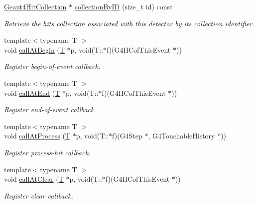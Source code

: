 \begin{DoxyCompactItemize}
\hyperlink{class_d_d4hep_1_1_simulation_1_1_geant4_hit_collection}{Geant4\+Hit\+Collection} $\ast$ \hyperlink{class_d_d4hep_1_1_simulation_1_1_geant4_sens_det_action_sequence_a51a324ce960e144da1f1a16a8c18f6f1}{collection\+By\+ID} (size\+\_\+t id) const
\begin{DoxyCompactList}\small\item\em Retrieve the hits collection associated with this detector by its collection identifier. \end{DoxyCompactList}\item 
{\footnotesize template$<$typename T $>$ }\\void \hyperlink{class_d_d4hep_1_1_simulation_1_1_geant4_sens_det_action_sequence_a45cf860e819a71b04572873736f809bb}{call\+At\+Begin} (\hyperlink{class_t}{T} $\ast$p, void(T\+::$\ast$f)(G4\+H\+Cof\+This\+Event $\ast$))
\begin{DoxyCompactList}\small\item\em Register begin-\/of-\/event callback. \end{DoxyCompactList}\item 
{\footnotesize template$<$typename T $>$ }\\void \hyperlink{class_d_d4hep_1_1_simulation_1_1_geant4_sens_det_action_sequence_aaba81a735f1ea292242434042174965b}{call\+At\+End} (\hyperlink{class_t}{T} $\ast$p, void(T\+::$\ast$f)(G4\+H\+Cof\+This\+Event $\ast$))
\begin{DoxyCompactList}\small\item\em Register end-\/of-\/event callback. \end{DoxyCompactList}\item 
{\footnotesize template$<$typename T $>$ }\\void \hyperlink{class_d_d4hep_1_1_simulation_1_1_geant4_sens_det_action_sequence_aa9a28a577e7167e18f9312febfe67657}{call\+At\+Process} (\hyperlink{class_t}{T} $\ast$p, void(T\+::$\ast$f)(G4\+Step $\ast$, G4\+Touchable\+History $\ast$))
\begin{DoxyCompactList}\small\item\em Register process-\/hit callback. \end{DoxyCompactList}\item 
{\footnotesize template$<$typename T $>$ }\\void \hyperlink{class_d_d4hep_1_1_simulation_1_1_geant4_sens_det_action_sequence_a33ec5e2e883d0b8e1fa1ed7fe564ccbb}{call\+At\+Clear} (\hyperlink{class_t}{T} $\ast$p, void(T\+::$\ast$f)(G4\+H\+Cof\+This\+Event $\ast$))
\begin{DoxyCompactList}\small\item\em Register clear callback. \end{DoxyCompactList}\item 

\end{DoxyCompactItemize}
